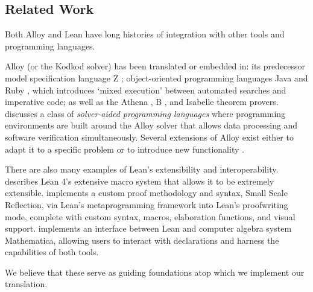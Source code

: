 \subsection{Related Work}\label{sec:bg-related}

Both Alloy and Lean have long histories of integration with other tools and programming languages. 

Alloy (or the Kodkod solver) has been translated or embedded in: its predecessor model specification language Z \cite{malik2010translating}; object-oriented programming languages Java \cite{milicevic2010executable} and Ruby \cite{milicevic2014alpha}, which introduces `mixed execution' between automated searches and imperative code; as well as the Athena \cite{arkoudas2000denotational,musser2003proving}, B \cite{mikhailov2002approach,krings2018translation}, and Isabelle \cite{blanchette2010nitpick} theorem provers. \cite{st2023comparison} discusses a class of \emph{solver-aided programming languages} where programming environments are built around the Alloy solver that allows data processing and software verification simultaneously. Several extensions of Alloy exist either to adapt it to a specific problem \cite{nelson2014tierless,nelson2015static} or to introduce new functionality \cite{nelson2012toward,milicevic2019alloy,yang2020alloymc}. 

There are also many examples of Lean's extensibility and interoperability. \cite{ullrich2022beyond} describes Lean 4's extensive macro system that allows it to be extremely extensible. \cite{gladshtein2024small} implements a custom proof methodology and syntax, Small Scale Reflection, via Lean's metaprogramming framework into Lean's proofwriting mode, complete with custom syntax, macros, elaboration functions, and visual support. \cite{lewis2022bi} implements an interface between Lean and computer algebra system Mathematica, allowing users to interact with declarations and harness the capabilities of both tools. 

We believe that these serve as guiding foundations atop which we implement our translation. 